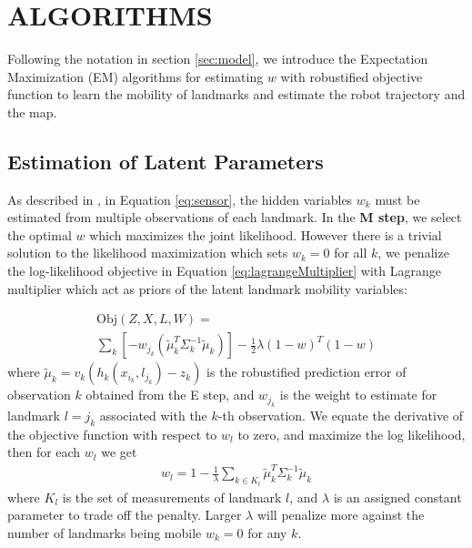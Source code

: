 \section{ALGORITHMS}
Following the notation in section \ref{sec:model}, we introduce the Expectation Maximization (EM) algorithms for estimating $w$ with robustified objective function to learn the mobility of landmarks and estimate the robot trajectory and the map.

\subsection{Estimation of Latent Parameters}
\label{sec:traditionalEM}

As described in \cite{rogers2010slam}, in Equation \ref{eq:sensor}, the hidden variables $w_k$ must be estimated from multiple observations of each landmark. In the \textbf{M step}, we select the optimal $w$ which maximizes the joint likelihood. However there is a trivial solution to the likelihood maximization which sets $w_k = 0$ for all $k$, we penalize the log-likelihood objective in Equation \ref{eq:lagrangeMultiplier} with Lagrange multiplier which act as priors of the latent landmark mobility variables:

\begin{multline}
\mathrm{Obj}(Z, X, L, W) = \\ \sum_k \left[ -w_{j_k}(\tilde{\mu}^T_k\Sigma_k^{-1}\tilde{\mu}_k) \right] - \frac{1}{2}\lambda(1 - w)^T(1 - w)
\label{eq:lagrangeMultiplier}
\end{multline}
where $\tilde{\mu}_k = v_k (h_k(x_{i_k}, l_{j_k}) - z_k)$ is the robustified prediction error of observation $k$ obtained from the E step, and $w_{j_k}$ is the weight to estimate for landmark $l = j_k$ associated with the $k$-th observation. We equate the derivative of the objective function with respect to $w_l$ to zero, and maximize the log likelihood, then for each $w_l$ we get
\begin{equation}
\begin{aligned}
w_l = 1 - \frac{1}{\lambda} \sum_{k \in K_l}\tilde{\mu}^T_k\Sigma_k^{-1}\tilde{\mu}_k
\end{aligned}
\label{eq:wk}
\end{equation}
where $K_l$ is the set of measurements of landmark $l$, and $\lambda$ is an assigned constant parameter to trade off the penalty. Larger $\lambda$ will penalize more against the number of landmarks being mobile $w_k = 0$ for any $k$.

